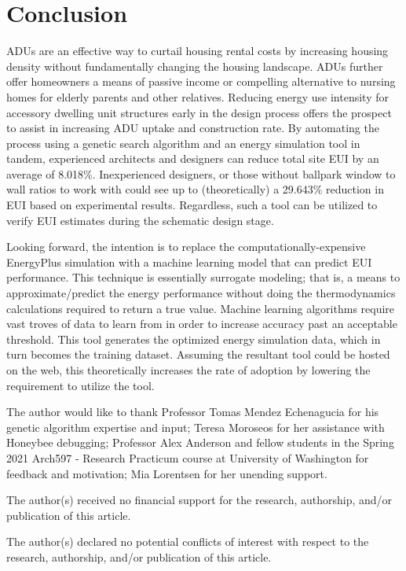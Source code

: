 \documentclass[sagev,times,Review,doublespace]{sagej}
\begin{document}
\section{Conclusion}
ADUs are an effective way to curtail housing rental costs by increasing housing density without fundamentally changing the housing landscape. ADUs further offer homeowners a means of passive income or compelling alternative to nursing homes for elderly parents and other relatives. Reducing energy use intensity for accessory dwelling unit structures early in the design process offers the prospect to assist in increasing ADU uptake and construction rate. By automating the process using a genetic search algorithm and an energy simulation tool in tandem, experienced architects and designers can reduce total site EUI by an average of 8.018\%. Inexperienced designers, or those without ballpark window to wall ratios to work with could see up to (theoretically) a 29.643\% reduction in EUI based on experimental results. Regardless, such a tool can be utilized to verify EUI estimates during the schematic design stage.

Looking forward, the intention is to replace the computationally-expensive EnergyPlus simulation with a machine learning model that can predict EUI performance. This technique is essentially  surrogate modeling; that is, a means to approximate/predict the energy performance without doing the thermodynamics calculations required to return a true value. Machine learning algorithms require vast troves of data to learn from in order to increase accuracy past an acceptable threshold. This tool generates the optimized energy simulation data, which in turn becomes the training dataset. Assuming the resultant tool could be hosted on the web, this theoretically increases the rate of adoption by lowering the requirement to utilize the tool. 

\begin{acks}
The author would like to thank Professor Tomas Mendez Echenagucia for his genetic algorithm expertise and input; Teresa Moroseos for her assistance with Honeybee debugging; Professor Alex Anderson and fellow students in the Spring 2021 Arch597 - Research Practicum course at University of Washington for feedback and motivation; Mia Lorentsen for her unending support.
\end{acks}

\begin{funding}
The author(s) received no financial support for the research, authorship, and/or publication of this article.
\end{funding}

\begin{dci}
	The author(s) declared no potential conflicts of interest with respect to the research, authorship, and/or publication of this article.
\end{dci}



\end{document}
